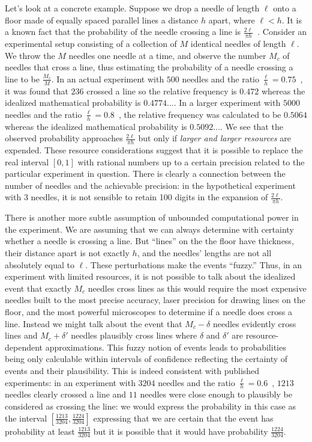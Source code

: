 \documentclass{article}
\theoremstyle{remark}
\begin{document}
Let's look at a concrete example. Suppose we drop a needle of length
$\ell$ onto a floor made of equally spaced parallel lines a distance
$h$ apart, where $\ell<h$. It is a known fact that the probability
of the needle crossing a line is $\frac{2\ell}{\pi h}$~\cite{Buffon1777,DeMorgan1872,Hall1873,Uspensky1937}.
Consider an experimental setup consisting of a collection of $M$
identical needles of length $\ell$. We throw the $M$ needles one
needle at a time, and observe the number $M_{c}$ of needles that
cross a line, thus estimating the probability of a needle crossing
a line to be $\frac{M_{c}}{M}$. In an actual experiment with $500$
needles and the ratio $\frac{\ell}{h}=0.75$~\cite{Hall1873}, it
was found that $236$ crossed a line so the relative frequency is
$0.472$ whereas the idealized mathematical probability is $0.4774\ldots$.
In a larger experiment with $5000$ needles and the ratio $\frac{\ell}{h}=0.8$~\cite{Uspensky1937},
the relative frequency was calculated to be $0.5064$ whereas the
idealized mathematical probability is $0.5092\ldots$. We see that
the observed probability approaches $\frac{2\ell}{\pi h}$ but only
if \emph{larger and larger resources} are expended. These resource
considerations suggest that it is possible to replace the real interval
$[0,1]$ with rational numbers up to a certain precision related to
the particular experiment in question. There is clearly a connection
between the number of needles and the achievable precision: in the
hypothetical experiment with 3 needles, it is not sensible to retain
100 digits in the expansion of $\frac{2\ell}{\pi h}$.

There is another more subtle assumption of unbounded computational
power in the experiment. We are assuming that we can always determine
with certainty whether a needle is crossing a line. But ``lines''
on the the floor have thickness, their distance apart is not exactly
$h$, and the needles' lengths are not all absolutely equal to $\ell$.
These perturbations make the events ``fuzzy.'' Thus, in an experiment
with limited resources, it is not possible to talk about the idealized
event that exactly $M_{c}$ needles cross lines as this would require
the most expensive needles built to the most precise accuracy, laser
precision for drawing lines on the floor, and the most powerful microscopes
to determine if a needle does cross a line. Instead we might talk
about the event that $M_{c}-\delta$ needles evidently cross lines
and $M_{c}+\delta'$ needles plausibly cross lines where $\delta$
and $\delta'$ are resource-dependent approximations. This fuzzy notion
of events leads to probabilities being only calculable within intervals
of confidence reflecting the certainty of events and their plausibility.
This is indeed consistent with published experiments: in an experiment
with $3204$ needles and the ratio $\frac{\ell}{h}=0.6$~\cite{DeMorgan1872},
$1213$ needles clearly crossed a line and $11$ needles were close
enough to plausibly be considered as crossing the line: we would express
the probability in this case as the interval $\left[\frac{1213}{3204},\frac{1224}{3204}\right]$
expressing that we are certain that the event has probability at least
$\frac{1213}{3204}$ but it is possible that it would have probability
$\frac{1224}{3204}$.
\end{document}
